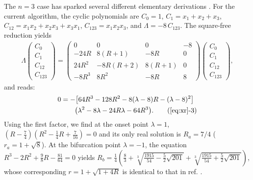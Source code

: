 \documentclass{ws-ijbc}
\begin{document}
The $n = 3$ case has sparked several different
  elementary derivations \cite{saha, bechhoefer, gordon, burm, zhang}.
For the current algorithm,
the cyclic polynomials are
$C_0 = 1$,
$C_1 = x_1 + x_2 + x_3$,
$C_{12} = x_1 x_2 + x_2 x_3 + x_3 x_1$,
$C_{123} = x_1 x_2 x_3$,
and
$\Lambda = -8 \, C_{123}$.
%
The square-free reduction yields
%
\footnotesize
\begin{align*}
\Lambda
\left( \begin{array}{c}
  C_0 \\
  C_1 \\
  C_{12} \\
  C_{123}
\end{array} \right)
=
\left( \begin{array}{cccc}
 0            & 0                 & 0               & -8 \\
 -24 R        & 8(R+1)            & -8R             & 0 \\
 24 R^2       & -8R(R+2)          & 8(R+1)          & 0 \\
 -8R^3        & 8R^2              & -8R             & 8
  \end{array} \right)
\left( \begin{array}{c}
  C_0 \\
  C_1 \\
  C_{12} \\
  C_{123}
\end{array} \right),
\end{align*}
\normalsize
%
%
%
and  reads:
\begin{align}
  0
&= -\big[
  64R^3 - 128 R^2 - 8 (\lambda - 8) R - (\lambda -8)^2
  \big] \notag \\
&\qquad
  \big(
  \lambda^2 - 8\lambda - 24 R\lambda - 64 R^3
  \big).
  \tag{\ref{eq:xr}-3}
\label{eq:xr3}
\end{align}
%
Using the first factor, we find at the onset point
  $\lambda = 1$,
  $\left(
  R-\frac74
  \right)
  \left(
  R^2-\frac14 R + \frac{7}{16}
  \right)=0$
  and its only real solution is $R_a = 7/4$ ($r_a = 1+\sqrt 8$).
%
At the bifurcation point $\lambda = -1$,
  the equation $R^3-2R^2 + \frac{9}{8} R -\frac{81}{64}=0$
  yields
  $R_b = \frac14
      \left(
      \frac{8}{3} +
        \sqrt[3]{\frac{1915}{54} - \frac52\sqrt{201}}
       +\sqrt[3]{\frac{1915}{54} + \frac52\sqrt{201}}
      \right)$,
whose corresponding $r = 1+\sqrt{1+4R}$
is identical to that in ref. \cite{gordon, burm}.
%
\end{document}
